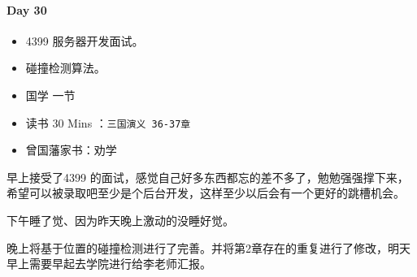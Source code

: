 \documentclass[UTF8,a4paper,8pt]{ctexart}
\begin{document}
 	 \paragraph{Day 30      \quad     }
	 	 \begin{itemize}[itemindent = 1em]
	 	 	\renewcommand\labelitemi{\makebox[0pt][l]{$\square$}\raisebox{.15ex}{\hspace{0.1em}$\checkmark$}}		
	 	 	\item    4399 服务器开发面试。
	 	 	\item    碰撞检测算法。
	 	 	
	 	 	
	 	 	\renewcommand\labelitemi{\makebox[0pt][l]{$\square$}\hspace{1em}}
	 	 	\item   国学  一节
	 	 	\item   读书  30 Mins	：\verb|三国演义 36-37章|
	 	 	\item   曾国藩家书：劝学
	 	 \end{itemize}
	 	 
	 	 
	 	 早上接受了4399 的面试，感觉自己好多东西都忘的差不多了，勉勉强强撑下来，希望可以被录取吧至少是个后台开发，这样至少以后会有一个更好的跳槽机会。
	 	 
	 	 下午睡了觉、因为昨天晚上激动的没睡好觉。
	 	 
	 	 晚上将基于位置的碰撞检测进行了完善。并将第2章存在的重复进行了修改，明天早上需要早起去学院进行给李老师汇报。
\end{document}
